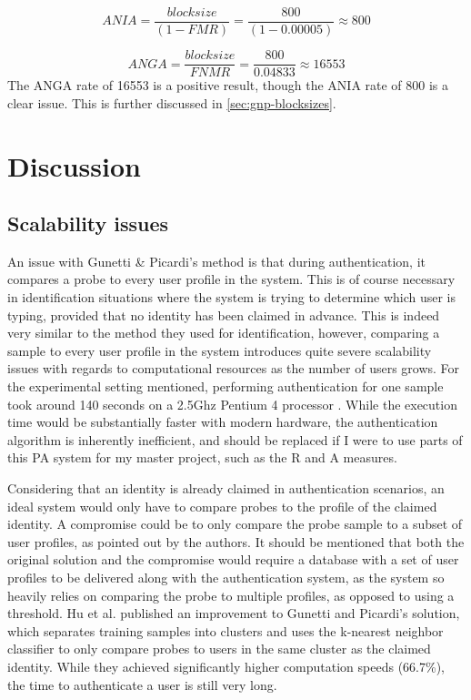 \documentclass[informationsecurity]{gucmasterproject}
\begin{document}
\begin{equation}
ANIA = \frac{block size}{(1-FMR)} = \frac{800}{(1-0.00005)} \approx 800
\end{equation}

\begin{equation}
ANGA = \frac{block size}{FNMR} = \frac{800}{0.04833} \approx 16553 
\end{equation}
The ANGA rate of 16553 is a positive result, though the ANIA rate of 800 is a clear issue.
This is further discussed in \cref{sec:gnp-blocksizes}.

\section{Discussion}
\subsection{Scalability issues}
\label{sec:gnp-scalability}
An issue with Gunetti \& Picardi's method is that during authentication, it compares a probe to every user profile in the system.
This is of course necessary in identification situations where the system is trying to determine which user is typing, provided that no identity has been claimed in advance.
This is indeed very similar to the method they used for identification, however, comparing a sample to every user profile in the system introduces quite severe scalability issues with regards to computational resources as the number of users grows.
For the experimental setting mentioned, performing authentication for one sample took around 140 seconds on a 2.5Ghz Pentium 4 processor \cite{gnp}. 
While the execution time would be substantially faster with modern hardware, the authentication algorithm is inherently inefficient, and should be replaced if I were to use parts of this PA system for my master project, such as the R and A measures.

Considering that an identity is already claimed in authentication scenarios, an ideal system would only have to compare probes to the profile of the claimed identity.
A compromise could be to only compare the probe sample to a subset of user profiles, as pointed out by the authors.
It should be mentioned that both the original solution and the compromise would require a database with a set of user profiles to be delivered along with the authentication system, as the system so heavily relies on comparing the probe to multiple profiles, as opposed to using a threshold.
Hu et al. \cite{hu} published an improvement to Gunetti and Picardi's solution, which separates training samples into clusters and uses the k-nearest neighbor classifier to only compare probes to users in the same cluster as the claimed identity.
While they achieved significantly higher computation speeds (66.7\%), the time to authenticate a user is still very long.
\end{document}
